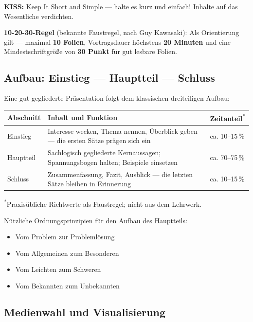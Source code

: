 \documentclass[11pt, a4paper]{article}
\begin{document}
\begin{merksatz}[title={\bfseries KISS-Regel und 10-20-30-Regel}]
\textbf{KISS:} Keep It Short and Simple --- halte es kurz und einfach! Inhalte auf das Wesentliche
verdichten.

\textbf{10-20-30-Regel} (bekannte Faustregel, nach Guy Kawasaki): Als Orientierung gilt ---
maximal \textbf{10 Folien}, Vortragsdauer höchstens \textbf{20 Minuten} und eine Mindestschriftgröße
von \textbf{30 Punkt} für gut lesbare Folien.
\end{merksatz}

\subsection{Aufbau: Einstieg --- Hauptteil --- Schluss}

Eine gut gegliederte Präsentation folgt dem klassischen dreiteiligen Aufbau:

\begin{center}
\begin{tabular}{p{3cm} p{5.5cm} p{4cm}}
\toprule
\textbf{Abschnitt} & \textbf{Inhalt und Funktion} & \textbf{Zeitanteil\textsuperscript{*}}\\
\midrule
Einstieg & Interesse wecken, Thema nennen, Überblick geben — die ersten Sätze prägen sich ein & ca. 10--15\,\%\\
\addlinespace
Hauptteil & Sachlogisch gegliederte Kernaussagen; Spannungsbogen halten; Beispiele einsetzen & ca. 70--75\,\%\\
\addlinespace
Schluss & Zusammenfassung, Fazit, Ausblick — die letzten Sätze bleiben in Erinnerung & ca. 10--15\,\%\\
\bottomrule
\end{tabular}

\smallskip
\footnotesize\textsuperscript{*}Praxisübliche Richtwerte als Faustregel; nicht aus dem Lehrwerk.
\end{center}

Nützliche Ordnungsprinzipien für den Aufbau des Hauptteils:
\begin{itemize}
  \item Vom Problem zur Problemlösung
  \item Vom Allgemeinen zum Besonderen
  \item Vom Leichten zum Schweren
  \item Vom Bekannten zum Unbekannten
\end{itemize}

\subsection{Medienwahl und Visualisierung}
\end{document}
